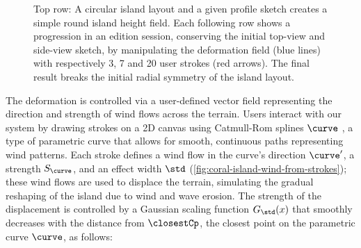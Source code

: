 \begin{figure} 
    \caption{Top row: A circular island layout and a given profile sketch creates a simple round island height field. Each following row shows a progression in an edition session, conserving the initial top-view and side-view sketch, by manipulating the deformation field (blue lines) with respectively 3, 7 and 20 user strokes (red arrows). The final result breaks the initial radial symmetry of the island layout. }
    \label{fig:coral-island-wind-stroke-edition}
\end{figure}

The deformation is controlled via a user-defined vector field representing the direction and strength of wind flows across the terrain. Users interact with our system by drawing strokes on a 2D canvas using Catmull-Rom splines $\curve$ \cite{Catmull1974}, a type of parametric curve that allows for smooth, continuous paths representing wind patterns. Each stroke defines a wind flow in the curve's direction $\curve'$, a strength $S_\curve$, and an effect width $\std$ (\cref{fig:coral-island-wind-from-strokes}); these wind flows are used to displace the terrain, simulating the gradual reshaping of the island due to wind and wave erosion. The strength of the displacement is controlled by a Gaussian scaling function $G_\std(x)$ that smoothly decreases with the distance from $\closestCp$, the closest point on the parametric curve $\curve$, as follows:


